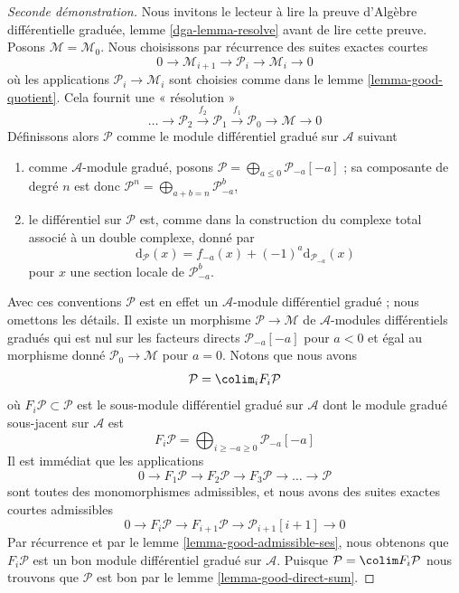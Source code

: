 \begin{proof}[Seconde démonstration]
Nous invitons le lecteur à lire la preuve d'Algèbre différentielle
graduée, lemme \ref{dga-lemma-resolve} avant de lire cette preuve.
Posons $\mathcal{M} = \mathcal{M}_0$.
Nous choisissons par récurrence des suites
exactes courtes $$
0 \to \mathcal{M}_{i + 1} \to \mathcal{P}_i \to \mathcal{M}_i \to
0 $$
où
les applications $\mathcal{P}_i \to \mathcal{M}_i$ sont
choisies comme dans le lemme \ref{lemma-good-quotient}.
Cela
fournit une « résolution » $$
\ldots \to \mathcal{P}_2 \xrightarrow{f_2}
\mathcal{P}_1 \xrightarrow{f_1} \mathcal{P}_0 \to \mathcal{M} \to
0 $$
Définissons alors $\mathcal{P}$ comme le
module différentiel gradué sur $\mathcal{A}$
suivant \begin{enumerate}
\item comme $\mathcal{A}$-module gradué,
posons $\mathcal{P} = \bigoplus_{a \leq 0} \mathcal{P}_{-a}[-a]$ ; sa
composante de degré $n$ est donc
$\mathcal{P}^n = \bigoplus\nolimits_{a + b = n} \mathcal{P}_{-a}^b$,
\item le différentiel sur $\mathcal{P}$ est, comme dans la construction du complexe
total associé à un double complexe, donné par
$$
\text{d}_\mathcal{P}(x) = f_{-a}(x) + (-1)^a \text{d}_{\mathcal{P}_{-a}}(x)
$$ pour
$x$ une section locale de $\mathcal{P}_{-a}^b$.
\end{enumerate} Avec ces conventions
$\mathcal{P}$ est en effet un
$\mathcal{A}$-module différentiel gradué ; nous omettons les détails. Il existe un morphisme
$\mathcal{P} \to \mathcal{M}$ de
$\mathcal{A}$-modules différentiels gradués qui est nul sur les facteurs directs $\mathcal{P}_{-a}[-a]$ pour
$a < 0$ et égal au morphisme donné $\mathcal{P}_0 \to \mathcal{M}$ pour $a = 0$. Notons que
nous avons
$$
\mathcal{P} = \colim_i F_i\mathcal{P}
$$ où
$F_i\mathcal{P} \subset \mathcal{P}$ est le sous-module différentiel gradué sur
$\mathcal{A}$ dont le module gradué sous-jacent sur $\mathcal{A}$
est
$$
F_i\mathcal{P} =
\bigoplus\nolimits_{i \geq -a \geq 0} \mathcal{P}_{-a}[-a]
$$ Il est immédiat
que les applications
$$ 0
\to F_1\mathcal{P} \to F_2\mathcal{P} \to F_3\mathcal{P} \to
\ldots \to \mathcal{P}
$$ sont toutes des
monomorphismes admissibles, et nous avons des suites exactes courtes admissibles
$$ 0
\to F_i\mathcal{P} \to
F_{i + 1}\mathcal{P} \to
\mathcal{P}_{i + 1}[i + 1] \to 0
$$ Par
récurrence et par le lemme \ref{lemma-good-admissible-ses}, nous
obtenons que $F_i\mathcal{P}$ est un bon module différentiel
gradué sur $\mathcal{A}$. Puisque $\mathcal{P} = \colim F_i\mathcal{P}$ nous
trouvons que $\mathcal{P}$ est bon par le lemme \ref{lemma-good-direct-sum}.


\end{proof}
